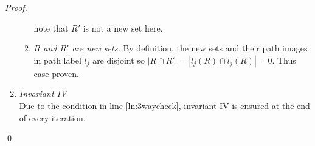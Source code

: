 \documentclass[a4paper,UKenglish,numberwithinsect]{lipics} %
\begin{document}
\begin{proof}
\begin{enumerate}[{Case }1:]
\begin{enumerate}[{Case 2.}1:]
      note that $R'$ is not a new set here.
    \item {\em $R$ and $R'$ are new sets.} By definition,
      the new sets and their path images in path label $l_j$ are
      disjoint so $|R \cap R'| = |l_j(R) \cap l_j(R)| = 0$. Thus case
      proven.
    \end{enumerate}
  \item {\em Invariant IV}\\
    Due to the condition in line \ref{ln:3waycheck}, invariant IV is
    ensured at the end of every iteration.
  \end{enumerate} 
\qed
\end{proof}
\end{document}
